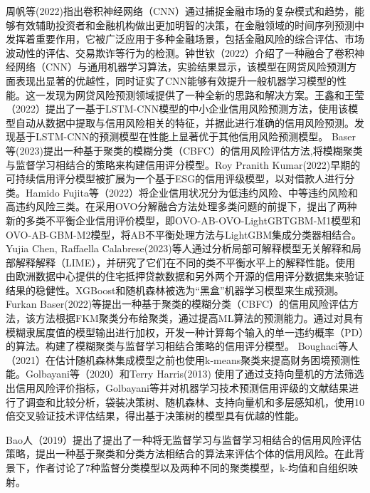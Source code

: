 周帆等(2022)指出卷积神经网络（CNN）通过捕捉金融市场的复杂模式和趋势，能够有效辅助投资者和金融机构做出更加明智的决策，在金融领域的时间序列预测中发挥着重要作用，它被广泛应用于多种金融场景，包括金融风险的综合评估、市场波动性的评估、交易欺诈等行为的检测。钟世钦（2022）介绍了一种融合了卷积神经网络（CNN）与通用机器学习算法，实验结果显示，该模型在网贷风险预测方面表现出显著的优越性，同时证实了CNN能够有效提升一般机器学习模型的性能。这一发现为网贷风险预测领域提供了一种全新的思路和解决方案。王鑫和王莹（2022）提出了一基于LSTM-CNN模型的中小企业信用风险预测方法，使用该模型自动从数据中提取与信用风险相关的特征，并据此进行准确的信用风险预测。发现基于LSTM-CNN的预测模型在性能上显著优于其他信用风险预测模型。
Baser等(2023)提出一种基于聚类的模糊分类（CBFC）的信用风险评估方法,将模糊聚类与监督学习相结合的策略来构建信用评分模型。Roy Pranith Kumar(2022)早期的可持续信用评分模型被扩展为一个基于ESG的信用评级模型，以对借款人进行分类。Hamido Fujita等（2022）将企业信用状况分为低违约风险、中等违约风险和高违约风险三类。在采用OVO分解融合方法处理多类问题的前提下，提出了两种新的多类不平衡企业信用评价模型，即OVO-AB-OVO-LightGBTGBM-M1模型和OVO-AB-GBM-M2模型，将AB不平衡处理方法与LightGBM集成分类器相结合。
Yujia Chen, Raffaella Calabrese(2023)等人通过分析局部可解释模型无关解释和局部解释解释（LIME），并研究了它们在不同的类不平衡水平上的解释性能。使用由欧洲数据中心提供的住宅抵押贷款数据和另外两个开源的信用评分数据集来验证结果的稳健性。XGBoost和随机森林被选为“黑盒”机器学习模型来生成预测。
Furkan Baser(2022)等提出一种基于聚类的模糊分类（CBFC）的信用风险评估方法，该方法根据FKM聚类分布给聚类，通过提高ML算法的预测能力。通过对具有模糊隶属度值的模型输出进行加权，开发一种计算每个输入的单一违约概率（PD）的算法。构建了模糊聚类与监督学习相结合策略的信用评分模型。
Boughaci等人（2021）在估计随机森林集成模型之前也使用k-means聚类来提高财务困境预测性能。Golbayani等（2020）和Terry Harris(2013) 使用了通过支持向量机的方法筛选出信用风险评价指标，Golbayani等并对机器学习技术预测信用评级的文献结果进行了调查和比较分析，袋装决策树、随机森林、支持向量机和多层感知机，使用10倍交叉验证技术评估结果，得出基于决策树的模型具有优越的性能。

Bao人（2019）提出了提出了一种将无监督学习与监督学习相结合的信用风险评估策略，提出一种基于聚类和分类方法相结合的算法来评估个体的信用风险。在此背景下，作者讨论了7种监督分类模型以及两种不同的聚类模型，k-均值和自组织映射。

